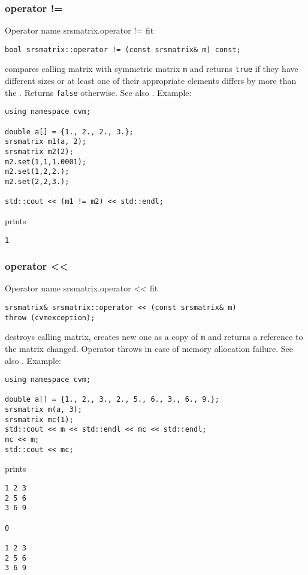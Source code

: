 \subsubsection{operator !=}
Operator%
\pdfdest name {srsmatrix.operator !=} fit
\begin{verbatim}
bool srsmatrix::operator != (const srsmatrix& m) const;
\end{verbatim}
compares  calling matrix with symmetric matrix \verb"m"
and returns \verb"true" if they have different sizes
or at least one of their appropriate elements
differs by more than the
.
Returns \verb"false" otherwise.
See also .
Example:
\begin{Verbatim}
using namespace cvm;

double a[] = {1., 2., 2., 3.};
srsmatrix m1(a, 2);
srsmatrix m2(2);
m2.set(1,1,1.0001); 
m2.set(1,2,2.);
m2.set(2,2,3.);

std::cout << (m1 != m2) << std::endl;
\end{Verbatim}
prints
\begin{Verbatim}
1
\end{Verbatim}
\newpage



\subsubsection{operator <{}<}
Operator%
\pdfdest name {srsmatrix.operator <<} fit
\begin{verbatim}
srsmatrix& srsmatrix::operator << (const srsmatrix& m)
throw (cvmexception);
\end{verbatim}
destroys  calling matrix, creates  new one as a copy of \verb"m"
and returns a reference to
the matrix changed.
Operator throws  
in case of memory allocation failure.
See also .
Example:
\begin{Verbatim}
using namespace cvm;

double a[] = {1., 2., 3., 2., 5., 6., 3., 6., 9.};
srsmatrix m(a, 3);
srsmatrix mc(1);
std::cout << m << std::endl << mc << std::endl;
mc << m;
std::cout << mc;
\end{Verbatim}
prints
\begin{Verbatim}
1 2 3
2 5 6
3 6 9

0

1 2 3
2 5 6
3 6 9
\end{Verbatim}
\newpage



